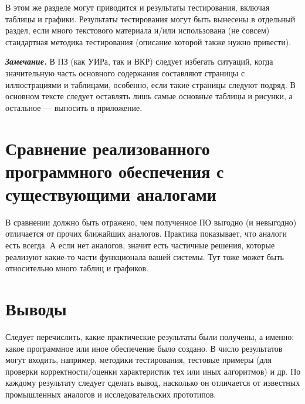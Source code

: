 В этом же разделе могут приводится и результаты тестирования, включая таблицы и
графики. Результаты тестирования могут быть вынесены в отдельный раздел, если
много текстового материала и/или использована (не совсем) стандартная методика
тестирования (описание которой также нужно привести).

\textit{\textbf{Замечание.}} В ПЗ (как УИРа, так и ВКР) следует избегать ситуаций, когда значительную часть основного содержания составляют страницы с иллюстрациями и таблицами, особенно, если такие страницы следуют подряд. В основном тексте следует оставлять лишь самые основные таблицы и рисунки, а остальное --- выносить в приложение.




\section{Сравнение реализованного программного обеспечения с существующими аналогами}

В сравнении должно быть отражено, чем полученное ПО выгодно (и невыгодно) отличается от прочих ближайших аналогов. Практика показывает, что аналоги есть всегда. А если нет аналогов, значит есть частичные решения, которые реализуют какие-то части функционала вашей системы. Тут тоже может быть относительно много таблиц и графиков.



\section{Выводы}

Следует перечислить, какие практические результаты были получены, а именно: какое программное или иное обеспечение было создано. В число результатов могут входить, например, методики тестирования, тестовые примеры (для проверки корректности/оценки характеристик тех или иных алгоритмов) и др. По каждому результату следует сделать вывод, насколько он отличается от известных промышленных аналогов и исследовательских прототипов.

